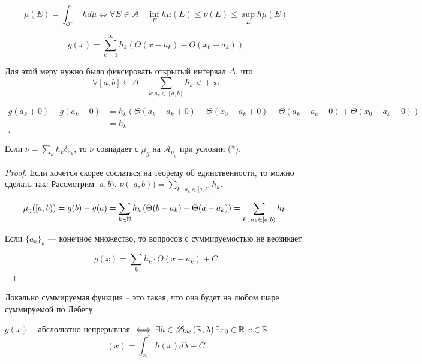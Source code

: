 
\begin{theorem}
    [воспоминание]

    \[\mu(E) = \int_{\Phi^{-1}} h d\mu \iff \forall E\in \mathscr{A} \quad \inf_E h \mu(E) \leqslant \nu(E) \leqslant \sup_E h \mu(E)\]
\end{theorem}

\begin{note}
    \[g(x) = \sum_{k=1}^{\infty } h_k \left( \Theta(x - a_k) - \Theta(x_0 - a_k) \right) \]

    Для этой меру нужно было фиксировать открытый интервал $\Delta$, что \[ \forall [a,b] \subseteq \Delta\quad \sum_{k: a_k\in [a,b]}h_k < +\infty  \]

    \begin{align*}
       g(a_k + 0) - g(a_k - 0) &= h_k\left( \Theta(a_k - a_k + 0) - \Theta(x_0 - a_k + 0) - \Theta(a_k-a_k - 0) + \Theta(x_0 -a_k - 0) \right)  \\ 
       &= h_k \\ %
    .\end{align*}
\end{note}

\begin{statement}    
Если $\nu = \sum\limits_k h_k \delta_{a_k}$, то $\nu$ совпадает с $\mu_g$ на $\mathscr{A}_{\mu_g}$ при условии (*).
\end{statement}
\begin{proof}

    Если хочется скорее сослаться на теорему об единственности, то можно сделать так:    
    Рассмотрим $[a, b)$. $\nu([a, b)) = \sum\limits_{k \,:\, a_k \in [a, b)} h_k.$

    \[ \mu_g([a, b)) = g(b) - g(a) = \sum_{k\in\N} h_k \left(\Theta(b - a_k) - \Theta(a - a_k)\right) = \sum_{k \,:\, a_k \in [a, b)} h_k.\]

    Если $\{ a_k\}_k$ --- конечное множество, то вопросов с суммируемостью не веознкает.

    \[g(x) = \sum_k h_k \cdot \Theta(x - a_k) + C   \]
\end{proof}

\begin{note}
    Локально суммируемая функция -- это такая, что она будет на любом шаре суммируемой по Лебегу
\end{note}

\begin{theorem}
    $g(x)$ -- абслолютно непрерывная $\iff \exists h\in \mathscr L_{loc}\left( \mathbb{R}, \lambda \right) \exists x_0\in \mathbb{R}, c\in \mathbb{R}$ 
    \[(x) = \int_{x_0}^x h(x) d\lambda + C\]
\end{theorem}  

